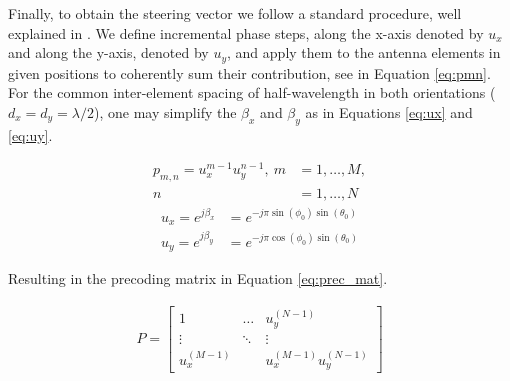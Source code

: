 Finally, to obtain the steering vector we follow a standard procedure, well explained in \cite{7925023}. We define incremental phase steps, along the x-axis denoted by $u_x$ and along the y-axis, denoted by $u_y$, and apply them to the antenna elements in given positions to coherently sum their contribution, see in Equation \eqref{eq:pmn}.
For the common inter-element spacing of half-wavelength in both orientations ($d_x = d_y = \lambda/2$), one may simplify the $\beta_x$ and $\beta_y$ as in Equations \eqref{eq:ux} and \eqref{eq:uy}.

\begin{align}
    p_{m,n} = u_x^{m-1} u_y^{n-1}, \ m &= 1, \dots, M, \label{eq:pmn} \\
    n &= 1, \dots, N \nonumber
\end{align}
\vspace{-1cm}
\begin{align}
    u_x = e^{j \beta_x} &= e^{-j \pi \sin(\phi_0) \sin(\theta_0)} \label{eq:ux} \\
    u_y = e^{j \beta_y} &= e^{-j \pi \cos(\phi_0) \sin(\theta_0)} \label{eq:uy}
\end{align}



\begin{comment}
\begin{align}
    u_x = e^{j \beta_x} &= e^{-j \pi \sin(\phi_r) \cos(\theta_r)} \label{eq:ux} \\
    u_y = e^{j \beta_y} &= e^{j \pi \cos(\phi_r) \cos(\theta_r)} \label{eq:uy}
\end{align}
\end{comment}




Resulting in the precoding matrix in Equation \eqref{eq:prec_mat}.

\begin{align} \label{eq:prec_mat}
    P = \begin{bmatrix}
        1 & \dots & u_y^{(N-1)}\\
        \vdots & \ddots & \vdots\\
        u_x^{(M-1)} &  & u_x^{(M-1)}u_y^{(N-1)}
        \end{bmatrix}
\end{align}
















